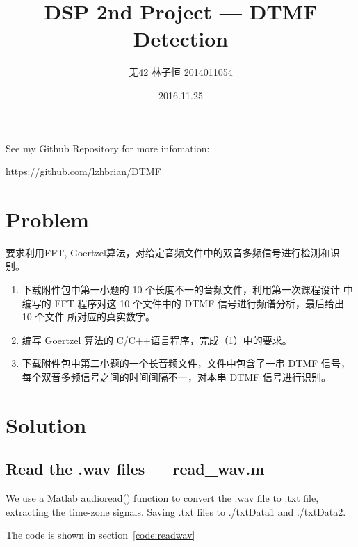 \documentclass[UTF8,a4paper]{ctexart}
\author{无42 林子恒 2014011054}
\title{DSP 2nd Project --- DTMF Detection}
\date{2016.11.25}
\begin{document}
  \maketitle
  \thispagestyle{empty}
	See my Github Repository for more infomation:
	
	https://github.com/lzhbrian/DTMF

\tableofcontents

\newpage


\section{Problem}
要求利用FFT, Goertzel算法，对给定音频文件中的双音多频信号进行检测和识别。

\begin{enumerate}

\item 下载附件包中第一小题的 10 个长度不一的音频文件，利用第一次课程设计 中编写的 FFT 程序对这 10 个文件中的 DTMF 信号进行频谱分析，最后给出 10 个文件 所对应的真实数字。
\item 编写 Goertzel 算法的 C/C++语言程序，完成（1）中的要求。
\item 下载附件包中第二小题的一个长音频文件，文件中包含了一串 DTMF 信号， 每个双音多频信号之间的时间间隔不一，对本串 DTMF 信号进行识别。

\end{enumerate}


\section{Solution}


\subsection{Read the .wav files --- read\_wav.m}

We use a Matlab audioread() function to convert the .wav file to .txt file, extracting the time-zone signals. Saving .txt files to ./txtData1 and ./txtData2.

The code is shown in section~\ref{code:readwav}






\newpage


\end{document}
